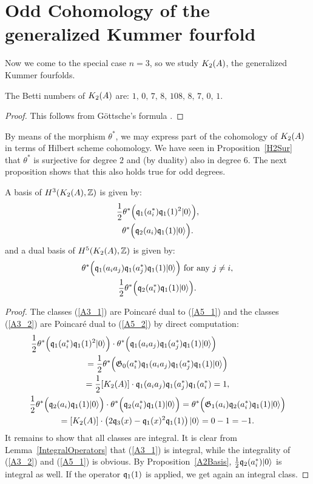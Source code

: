\section{Odd Cohomology of the generalized Kummer fourfold}
Now we come to the special case $n=3$, so we study $\kum{A}{2}$, the generalized Kummer fourfolds.
\begin{proposition}
The Betti numbers of $\kum{A}{2}$ are:
$
1,\,0,\,7,\,8,\,108,\,8,\,7,\,0,\,1.
$
\end{proposition}
\begin{proof}
This follows from G\"ottsche's formula \cite[page 49]{Gottsche}.
\end{proof}

By means of the morphism $\theta^*$, we may express part of the cohomology of $\kum{A}{2}$ in terms of Hilbert scheme cohomology. We have seen in Proposition~\ref{H2Sur} that $\theta^*$ is surjective for degree $2$ and (by duality) also in degree $6$. 
The next proposition shows that this also holds true for odd degrees.
\begin{proposition}\label{oddcohomology}
A basis of $H^3(\X,\Z)$ is given by:
\begin{gather}
\label{A3_1}
\frac{1}{2}\theta^*\Big( \q_1(a^*_i)\q_1(1)^2\vac \Big), \\
\label{A3_2}
\theta^*\Big(\q_2(a_i)\q_1(1)\vac\Big).
\end{gather}
and a dual basis of $H^5(\X,\Z)$ is given by:
\begin{gather}
\label{A5_1}
 \theta^*\Big( \q_1(a_ia_j)\q_1(a_j^*)\q_1(1) \vac \Big) \ \text{for any } j\neq i, \\
\label{A5_2}
\frac{1}{2}\theta^*\Big( \q_2(a^*_i)\q_1(1)\vac \Big).
\end{gather}
\end{proposition}
\begin{proof}
The classes (\ref{A3_1}) are Poincar\'e dual to (\ref{A5_1}) and the classes (\ref{A3_2}) are Poincar\'e dual to (\ref{A5_2}) by direct computation:
\begin{gather*}
\frac{1}{2}\theta^*\Big( \q_1(a^*_i)\q_1(1)^2\vac \Big)\cdot \theta^*\Big( \q_1(a_ia_j)\q_1(a_j^*)\q_1(1) \vac \Big) \hspace{80pt}
\\ = \frac{1}{2} \theta^*\Big(  \G_0(a^*_i) \q_1(a_ia_j)\q_1(a_j^*)\q_1(1) \vac \Big)\\
 =  \frac{1}{2}[\X]\cdot \q_1(a_ia_j)\q_1(a_j^*)\q_1(a_i^*) = 1, \\
 \frac{1}{2}\theta^*\Big(\q_2(a_i)\q_1(1)\vac\Big)\cdot \theta^*\Big( \q_2(a^*_i)\q_1(1)\vac \Big) =\theta^*\Big( \G_1(a_i)\q_2(a^*_i)\q_1(1)\vac  \Big) \\
 = [\X]\cdot \left( 2\q_3(x) - \q_1(x)^2\q_1(1) \right) \vac = 0-1=-1.
\end{gather*}
It remains to show that all classes are integral.
It is clear from Lemma~\ref{IntegralOperators} that (\ref{A3_1}) is integral, while the integrality of (\ref{A3_2}) and (\ref{A5_1}) is obvious. By Proposition~\ref{A2Basis}, $\frac{1}{2}\q_2(a^*_i)\vac$ is integral as well. If the operator $ \q_1(1)$ is applied, we get again an integral class.
\end{proof}

